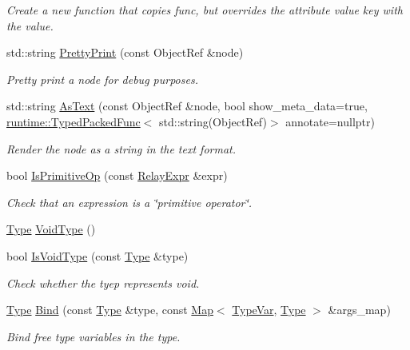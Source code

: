 \begin{DoxyCompactItemize}
\begin{DoxyCompactList}\small\item\em Create a new function that copies func, but overrides the attribute value key with the value. \end{DoxyCompactList}\item 
std\+::string \hyperlink{namespacetvm_a52d7b2faa9f73a02d3e983b80af1f2a5}{Pretty\+Print} (const Object\+Ref \&node)
\begin{DoxyCompactList}\small\item\em Pretty print a node for debug purposes. \end{DoxyCompactList}\item 
std\+::string \hyperlink{namespacetvm_a535496e3535d7128d7fe4a52a397f538}{As\+Text} (const Object\+Ref \&node, bool show\+\_\+meta\+\_\+data=true, \hyperlink{classtvm_1_1runtime_1_1TypedPackedFunc}{runtime\+::\+Typed\+Packed\+Func}$<$ std\+::string(Object\+Ref)$>$ annotate=nullptr)
\begin{DoxyCompactList}\small\item\em Render the node as a string in the text format. \end{DoxyCompactList}\item 
bool \hyperlink{namespacetvm_a8259e23409eda017c6bde908e050b670}{Is\+Primitive\+Op} (const \hyperlink{classtvm_1_1RelayExpr}{Relay\+Expr} \&expr)
\begin{DoxyCompactList}\small\item\em Check that an expression is a \char`\"{}primitive operator\char`\"{}. \end{DoxyCompactList}\item 
\hyperlink{classtvm_1_1Type}{Type} \hyperlink{namespacetvm_a27df956aaa2e5e25005e0f9dc1638a08}{Void\+Type} ()
\item 
bool \hyperlink{namespacetvm_a196edb73fc9f13d965b8de1c9287a2db}{Is\+Void\+Type} (const \hyperlink{classtvm_1_1Type}{Type} \&type)
\begin{DoxyCompactList}\small\item\em Check whether the tyep represents void. \end{DoxyCompactList}\item 
\hyperlink{classtvm_1_1Type}{Type} \hyperlink{namespacetvm_a7f0738778e1a4f1725bea3d6c801aab4}{Bind} (const \hyperlink{classtvm_1_1Type}{Type} \&type, const \hyperlink{classtvm_1_1Map}{Map}$<$ \hyperlink{classtvm_1_1TypeVar}{Type\+Var}, \hyperlink{classtvm_1_1Type}{Type} $>$ \&args\+\_\+map)
\begin{DoxyCompactList}\small\item\em Bind free type variables in the type. \end{DoxyCompactList}\item 

\end{DoxyCompactItemize}
